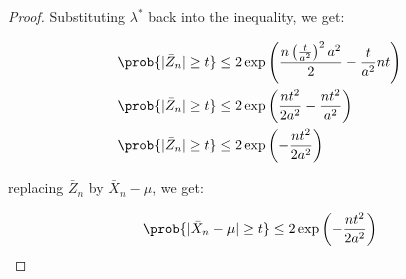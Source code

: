 \begin{proof}
Substituting $\lambda^*$ back into the inequality, we get:

\begin{align*}
\prob{|\bar{Z}_n| \geq t} &\leq
    2 \exp\left(\frac{n\left(\frac{t}{a^2}\right)^2a^2}{2} - \frac{t}{a^2} n t \right)\\
\prob{|\bar{Z}_n| \geq t} &\leq
    2 \exp\left(\frac{nt^2}{2a^2} - \frac{nt^2}{a^2} \right)\\
\prob{|\bar{Z}_n| \geq t} &\leq
    2 \exp\left(-\frac{nt^2}{2a^2} \right)\\
\end{align*}

replacing $\bar{Z}_n$ by $\bar{X}_n - \mu$, we get:

\begin{align*}
\prob{|\bar{X}_n - \mu| \geq t} \leq 2 \exp\left(-\frac{nt^2}{2 a^2}\right)
\end{align*}

\end{proof}